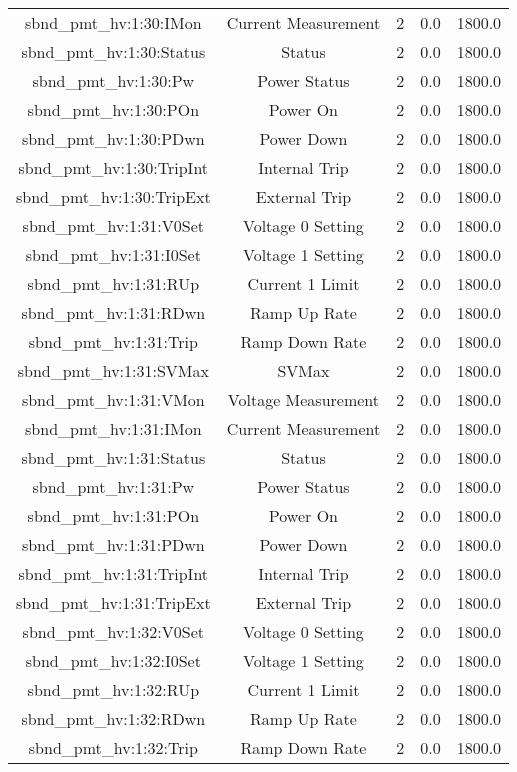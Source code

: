 \begin{center}
\begin{longtable}{c | c c c c }
sbnd\_pmt\_hv:1:30:IMon & Current Measurement & 2 & 0.0 & 1800.0\\ 
sbnd\_pmt\_hv:1:30:Status & Status & 2 & 0.0 & 1800.0\\ 
sbnd\_pmt\_hv:1:30:Pw & Power Status & 2 & 0.0 & 1800.0\\ 
sbnd\_pmt\_hv:1:30:POn & Power On & 2 & 0.0 & 1800.0\\ 
sbnd\_pmt\_hv:1:30:PDwn & Power Down & 2 & 0.0 & 1800.0\\ 
sbnd\_pmt\_hv:1:30:TripInt & Internal Trip & 2 & 0.0 & 1800.0\\ 
sbnd\_pmt\_hv:1:30:TripExt & External Trip & 2 & 0.0 & 1800.0\\ 
sbnd\_pmt\_hv:1:31:V0Set & Voltage 0 Setting & 2 & 0.0 & 1800.0\\ 
sbnd\_pmt\_hv:1:31:I0Set & Voltage 1 Setting & 2 & 0.0 & 1800.0\\ 
sbnd\_pmt\_hv:1:31:RUp & Current 1 Limit & 2 & 0.0 & 1800.0\\ 
sbnd\_pmt\_hv:1:31:RDwn & Ramp Up Rate & 2 & 0.0 & 1800.0\\ 
sbnd\_pmt\_hv:1:31:Trip & Ramp Down Rate & 2 & 0.0 & 1800.0\\ 
sbnd\_pmt\_hv:1:31:SVMax & SVMax & 2 & 0.0 & 1800.0\\ 
sbnd\_pmt\_hv:1:31:VMon & Voltage Measurement & 2 & 0.0 & 1800.0\\ 
sbnd\_pmt\_hv:1:31:IMon & Current Measurement & 2 & 0.0 & 1800.0\\ 
sbnd\_pmt\_hv:1:31:Status & Status & 2 & 0.0 & 1800.0\\ 
sbnd\_pmt\_hv:1:31:Pw & Power Status & 2 & 0.0 & 1800.0\\ 
sbnd\_pmt\_hv:1:31:POn & Power On & 2 & 0.0 & 1800.0\\ 
sbnd\_pmt\_hv:1:31:PDwn & Power Down & 2 & 0.0 & 1800.0\\ 
sbnd\_pmt\_hv:1:31:TripInt & Internal Trip & 2 & 0.0 & 1800.0\\ 
sbnd\_pmt\_hv:1:31:TripExt & External Trip & 2 & 0.0 & 1800.0\\ 
sbnd\_pmt\_hv:1:32:V0Set & Voltage 0 Setting & 2 & 0.0 & 1800.0\\ 
sbnd\_pmt\_hv:1:32:I0Set & Voltage 1 Setting & 2 & 0.0 & 1800.0\\ 
sbnd\_pmt\_hv:1:32:RUp & Current 1 Limit & 2 & 0.0 & 1800.0\\ 
sbnd\_pmt\_hv:1:32:RDwn & Ramp Up Rate & 2 & 0.0 & 1800.0\\ 
sbnd\_pmt\_hv:1:32:Trip & Ramp Down Rate & 2 & 0.0 & 1800.0\\ 

\end{longtable}
\end{center}
